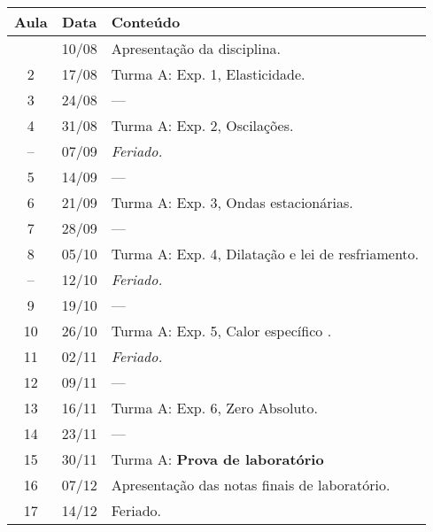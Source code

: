 \begin{center}
\begin{longtable}{ccp{70mm}}
\toprule
Aula & Data & Conteúdo \\
\midrule
\endhead
\bottomrule
\endfoot
 1 & 10/08 & Apresentação da disciplina. \\
 2 & 17/08 & Turma A: Exp. 1, Elasticidade. \\
 3 & 24/08 & --- \\ %
 4 & 31/08 & Turma A: Exp. 2, Oscilações. \\
-- & 07/09 & \emph{Feriado.} \\
 5 & 14/09 & --- \\ %
 6 & 21/09 & Turma A: Exp. 3, Ondas estacionárias. \\
 7 & 28/09 & --- \\ %
 8 & 05/10 & Turma A: Exp. 4, Dilatação e lei de resfriamento. \\
-- & 12/10 & \emph{Feriado.} \\
 9 & 19/10 & --- \\ %
10 & 26/10 & Turma A: Exp. 5, Calor específico . \\
11 & 02/11 & \emph{Feriado.} \\
12 & 09/11 & --- \\ %
13 & 16/11 & Turma A: Exp. 6, Zero Absoluto. \\
14 & 23/11 & --- \\ %
15 & 30/11 & Turma A: \textbf{Prova de laboratório} \\ %
16 & 07/12 & Apresentação das notas finais de laboratório. \\
17 & 14/12 & Feriado. \\
\end{longtable}
\end{center}

\clearpage


